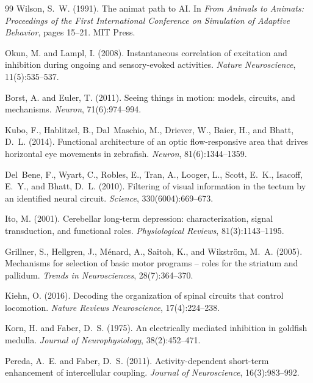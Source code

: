\documentclass[12pt]{article}
\begin{document}
\begin{thebibliography}{99}
Wilson, S.~W. (1991).
The animat path to {AI}.
In \textit{From Animals to Animats: Proceedings of the First International Conference on Simulation of Adaptive Behavior}, pages 15--21. MIT Press.

Okun, M. and Lampl, I. (2008).
Instantaneous correlation of excitation and inhibition during ongoing and sensory-evoked activities.
\textit{Nature Neuroscience}, 11(5):535--537.

Borst, A. and Euler, T. (2011).
Seeing things in motion: models, circuits, and mechanisms.
\textit{Neuron}, 71(6):974--994.

Kubo, F., Hablitzel, B., Dal~Maschio, M., Driever, W., Baier, H., and Bhatt, D.~L. (2014).
Functional architecture of an optic flow-responsive area that drives horizontal eye movements in zebrafish.
\textit{Neuron}, 81(6):1344--1359.

Del~Bene, F., Wyart, C., Robles, E., Tran, A., Looger, L., Scott, E.~K., Isacoff, E.~Y., and Bhatt, D.~L. (2010).
Filtering of visual information in the tectum by an identified neural circuit.
\textit{Science}, 330(6004):669--673.

Ito, M. (2001).
Cerebellar long-term depression: characterization, signal transduction, and functional roles.
\textit{Physiological Reviews}, 81(3):1143--1195.

Grillner, S., Hellgren, J., M{\'e}nard, A., Saitoh, K., and Wikstr{\"o}m, M.~A. (2005).
Mechanisms for selection of basic motor programs -- roles for the striatum and pallidum.
\textit{Trends in Neurosciences}, 28(7):364--370.

Kiehn, O. (2016).
Decoding the organization of spinal circuits that control locomotion.
\textit{Nature Reviews Neuroscience}, 17(4):224--238.

Korn, H. and Faber, D.~S. (1975).
An electrically mediated inhibition in goldfish medulla.
\textit{Journal of Neurophysiology}, 38(2):452--471.

Pereda, A.~E. and Faber, D.~S. (2011).
Activity-dependent short-term enhancement of intercellular coupling.
\textit{Journal of Neuroscience}, 16(3):983--992.


\end{thebibliography}
\end{document}
